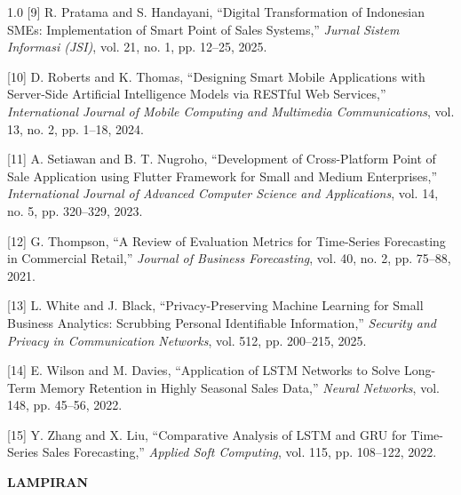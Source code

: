 \documentclass[12pt, a4paper, onecolumn, oneside]{report}
\begin{document}
\begin{spacing}{1.0}
\vspace{0.3cm}
\noindent\hangindent=1.5cm
{[9]} R. Pratama and S. Handayani, ``Digital Transformation of Indonesian SMEs: Implementation of Smart Point of Sales Systems,'' \textit{Jurnal Sistem Informasi (JSI)}, vol. 21, no. 1, pp. 12--25, 2025.

\vspace{0.3cm}
\noindent\hangindent=1.5cm
{[10]} D. Roberts and K. Thomas, ``Designing Smart Mobile Applications with Server-Side Artificial Intelligence Models via RESTful Web Services,'' \textit{International Journal of Mobile Computing and Multimedia Communications}, vol. 13, no. 2, pp. 1--18, 2024.

\vspace{0.3cm}
\noindent\hangindent=1.5cm
{[11]} A. Setiawan and B. T. Nugroho, ``Development of Cross-Platform Point of Sale Application using Flutter Framework for Small and Medium Enterprises,'' \textit{International Journal of Advanced Computer Science and Applications}, vol. 14, no. 5, pp. 320--329, 2023.

\vspace{0.3cm}
\noindent\hangindent=1.5cm
{[12]} G. Thompson, ``A Review of Evaluation Metrics for Time-Series Forecasting in Commercial Retail,'' \textit{Journal of Business Forecasting}, vol. 40, no. 2, pp. 75--88, 2021.

\vspace{0.3cm}
\noindent\hangindent=1.5cm
{[13]} L. White and J. Black, ``Privacy-Preserving Machine Learning for Small Business Analytics: Scrubbing Personal Identifiable Information,'' \textit{Security and Privacy in Communication Networks}, vol. 512, pp. 200--215, 2025.

\vspace{0.3cm}
\noindent\hangindent=1.5cm
{[14]} E. Wilson and M. Davies, ``Application of LSTM Networks to Solve Long-Term Memory Retention in Highly Seasonal Sales Data,'' \textit{Neural Networks}, vol. 148, pp. 45--56, 2022.

\vspace{0.3cm}
\noindent\hangindent=1.5cm
{[15]} Y. Zhang and X. Liu, ``Comparative Analysis of LSTM and GRU for Time-Series Sales Forecasting,'' \textit{Applied Soft Computing}, vol. 115, pp. 108--122, 2022.

\end{spacing}

\newpage
{}
\textbf{LAMPIRAN}
\end{document}
